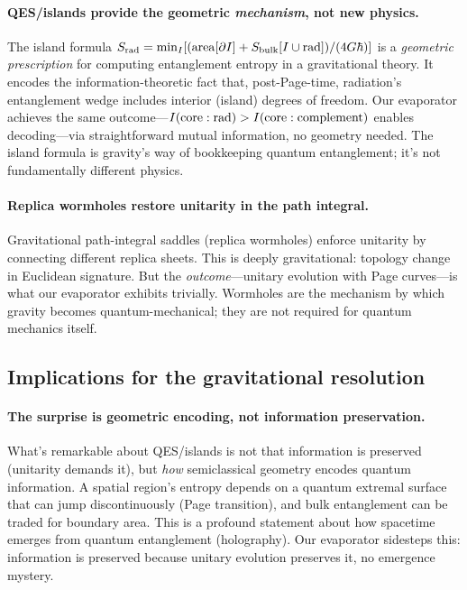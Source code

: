 \documentclass[aps,prx,onecolumn,showpacs,superscriptaddress,longbibliography,nofootinbib]{revtex4-2}
\begin{document}
\paragraph{QES/islands provide the geometric \emph{mechanism}, not new physics.}
The island formula $S_{\rm rad} = \min_I [ ({\rm area}[\partial I] + S_{\rm bulk}[I \cup {\rm rad}])/(4G\hbar) ]$ is a \emph{geometric prescription} for computing entanglement entropy in a gravitational theory. It encodes the information-theoretic fact that, post-Page-time, radiation's entanglement wedge includes interior (island) degrees of freedom. Our evaporator achieves the same outcome---$I({\rm core}:{\rm rad}) > I({\rm core}:{\rm complement})$ enables decoding---via straightforward mutual information, no geometry needed. The island formula is gravity's way of bookkeeping quantum entanglement; it's not fundamentally different physics.

\paragraph{Replica wormholes restore unitarity in the path integral.}
Gravitational path-integral saddles (replica wormholes) enforce unitarity by connecting different replica sheets. This is deeply gravitational: topology change in Euclidean signature. But the \emph{outcome}---unitary evolution with Page curves---is what our evaporator exhibits trivially. Wormholes are the mechanism by which gravity becomes quantum-mechanical; they are not required for quantum mechanics itself.

\subsection{Implications for the gravitational resolution}

\paragraph{The surprise is geometric encoding, not information preservation.}
What's remarkable about QES/islands is not that information is preserved (unitarity demands it), but \emph{how} semiclassical geometry encodes quantum information. A spatial region's entropy depends on a quantum extremal surface that can jump discontinuously (Page transition), and bulk entanglement can be traded for boundary area. This is a profound statement about how spacetime emerges from quantum entanglement (holography). Our evaporator sidesteps this: information is preserved because unitary evolution preserves it, no emergence mystery.
\end{document}
